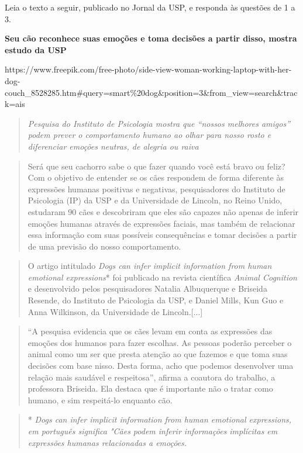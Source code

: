 {Leia o texto a seguir, publicado no Jornal da USP, e responda às
questões de 1 a 3.

\textbf{Seu cão reconhece suas emoções e toma decisões a partir disso,
mostra estudo da USP}

https://www.freepik.com/free-photo/side-view-woman-working-laptop-with-her-dog-couch\_8528285.htm\#query=smart\%20dog\&position=3\&from\_view=search\&track=ais

\begin{quote}
\emph{Pesquisa do Instituto de Psicologia mostra que ``nossos melhores
amigos'' podem prever o comportamento humano ao olhar para nosso rosto e
diferenciar emoções neutras, de alegria ou raiva}
\end{quote}

\begin{quote}
Será que seu cachorro sabe o que fazer quando você está bravo ou feliz?
Com o objetivo de entender se os cães respondem de forma diferente às
expressões humanas positivas e negativas, pesquisadores do Instituto de
Psicologia (IP) da USP e da Universidade de Lincoln, no Reino Unido,
estudaram 90 cães e descobriram que eles são capazes não apenas de
inferir emoções humanas através de expressões faciais, mas também de
relacionar essa informação com suas possíveis consequências e tomar
decisões a partir de uma previsão do nosso comportamento.
\end{quote}

\begin{quote}
O artigo intitulado \emph{Dogs can infer implicit information from human
emotional expressions}* foi publicado na revista científica \emph{Animal
Cognition} e desenvolvido pelos pesquisadores Natalia Albuquerque e
Briseida Resende, do Instituto de Psicologia da USP, e Daniel Mills, Kun
Guo e Anna Wilkinson, da Universidade de Lincoln.{[}...{]}
\end{quote}

\begin{quote}
``A pesquisa evidencia que os cães levam em conta as expressões das
emoções dos humanos para fazer escolhas. As pessoas poderão perceber o
animal como um ser que presta atenção ao que fazemos e que toma suas
decisões com base nisso. Desta forma, acho que podemos desenvolver uma
relação mais saudável e respeitosa'', afirma a coautora do trabalho, a
professora Briseida. Ela destaca que é importante não o tratar como
humano, e sim respeitá-lo enquanto cão.
\end{quote}

\begin{quote}
* \emph{Dogs can infer implicit information from human emotional
expressions, em português significa "Cães podem inferir informações
implícitas em expressões humanas relacionadas a emoções.}
\end{quote}

}
